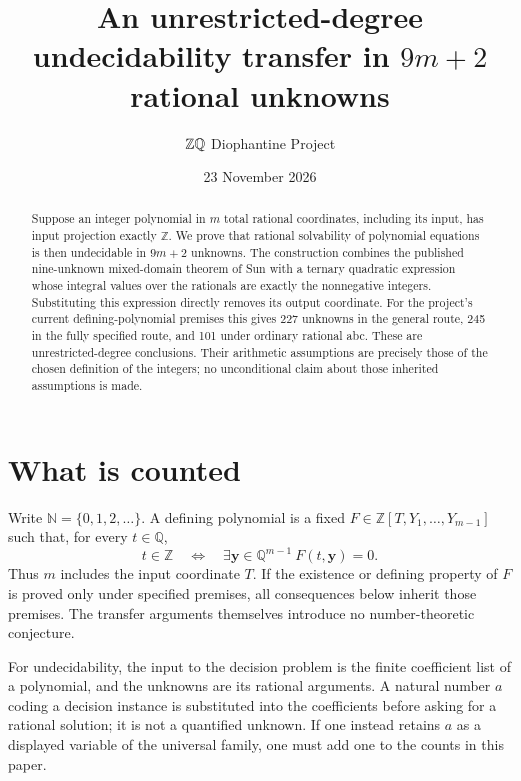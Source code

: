 \documentclass[11pt,a4paper]{article}
\title{An unrestricted-degree undecidability transfer in $9m+2$ rational unknowns}
\author{\(\Z\Q\) Diophantine Project}
\date{23 November 2026}
\newcommand{\Q}{\mathbb Q}\newcommand{\Z}{\mathbb Z}\newcommand{\N}{\mathbb N}
\begin{document}
\maketitle
\begin{abstract}
Suppose an integer polynomial in $m$ total rational coordinates, including its
input, has input projection exactly $\Z$. We prove that rational solvability of
polynomial equations is then undecidable in $9m+2$ unknowns. The construction
combines the published nine-unknown mixed-domain theorem of Sun with a ternary
quadratic expression whose integral values over the rationals are exactly the
nonnegative integers. Substituting this expression directly removes its output
coordinate. For the project's current defining-polynomial premises this gives
227 unknowns in the general route, 245 in the fully specified route, and 101
under ordinary rational abc. These are unrestricted-degree conclusions. Their
arithmetic assumptions are precisely those of the chosen definition of the
integers; no unconditional claim about those inherited assumptions is made.
\end{abstract}

\section{What is counted}
Write $\N=\{0,1,2,\ldots\}$. A defining polynomial is a fixed
$F\in\Z[T,Y_1,\ldots,Y_{m-1}]$ such that, for every $t\in\Q$,
\begin{equation}\label{defining}
 t\in\Z\quad\Longleftrightarrow\quad
 \exists\mathbf y\in\Q^{m-1}\ F(t,\mathbf y)=0.
\end{equation}
Thus $m$ includes the input coordinate $T$. If the existence or defining property
of $F$ is proved only under specified premises, all consequences below inherit
those premises. The transfer arguments themselves introduce no number-theoretic
conjecture.

For undecidability, the input to the decision problem is the finite coefficient
list of a polynomial, and the unknowns are its rational arguments. A natural
number $a$ coding a decision instance is substituted into the coefficients
before asking for a rational solution; it is not a quantified unknown. If one
instead retains $a$ as a displayed variable of the universal family, one must
add one to the counts in this paper.
\end{document}
